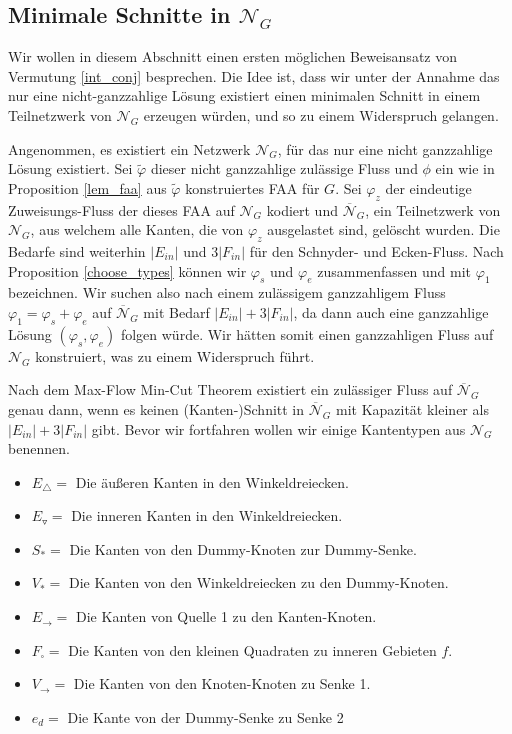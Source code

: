 \subsection{Minimale Schnitte in $\mathcal{N}_G$}

Wir wollen in diesem Abschnitt einen ersten möglichen Beweisansatz von Vermutung \ref{int_conj} besprechen. Die Idee ist, dass wir unter der Annahme das nur eine nicht-ganzzahlige Lösung existiert einen minimalen Schnitt in einem Teilnetzwerk von $\mathcal{N}_G$ erzeugen würden, und so zu einem Widerspruch gelangen. 

Angenommen, es existiert ein Netzwerk $\mathcal{N}_G$, für das nur eine nicht ganzzahlige Lösung existiert. Sei $\tilde{\varphi}$ dieser nicht ganzzahlige zulässige Fluss und $\phi$ ein wie in Proposition \ref{lem_faa} aus $\tilde{\varphi}$ konstruiertes FAA für $G$. Sei $\varphi_z$ der eindeutige Zuweisungs-Fluss der dieses FAA auf $\mathcal{N}_G$ kodiert und $\overline{\mathcal{N}}_G$, ein Teilnetzwerk von $\mathcal{N}_G$, aus welchem alle Kanten, die von $\varphi_z$ ausgelastet sind, gelöscht wurden. Die Bedarfe sind weiterhin $|E_{in}|$ und $3|F_{in}|$ für den Schnyder- und Ecken-Fluss. Nach Proposition \ref{choose_types} können wir $\varphi_s$ und $\varphi_e$ zusammenfassen und mit $\varphi_1$ bezeichnen. Wir suchen also nach einem zulässigem ganzzahligem Fluss $\varphi_1 = \varphi_s + \varphi_e$ auf $\overline{\mathcal{N}}_G$ mit Bedarf $|E_{in}| + 3|F_{in}|$, da dann auch eine ganzzahlige Lösung $(\varphi_s,\varphi_e)$ folgen würde. Wir hätten somit einen ganzzahligen Fluss auf $\mathcal{N}_G$ konstruiert, was zu einem Widerspruch führt.

Nach dem Max-Flow Min-Cut Theorem existiert ein zulässiger Fluss auf $\overline{\mathcal{N}}_G$ genau dann, wenn es keinen (Kanten-)Schnitt in $\overline{\mathcal{N}}_G$ mit Kapazität kleiner als $|E_{in}| + 3|F_{in}|$ gibt. Bevor wir fortfahren wollen wir einige Kantentypen aus $\mathcal{N}_G$ benennen.

\begin{itemize}
\item $E_\triangle = $ Die äußeren Kanten in den Winkeldreiecken.
\item $E_\triangledown = $ Die inneren Kanten in den Winkeldreiecken.
\item $S_* =$ Die Kanten von den Dummy-Knoten zur Dummy-Senke.
\item $V_* = $ Die Kanten von den Winkeldreiecken zu den Dummy-Knoten.
\item $E_{\to} = $ Die Kanten von Quelle 1 zu den Kanten-Knoten.
\item $F_\square = $ Die Kanten von den kleinen Quadraten zu inneren Gebieten $f$.
\item $V_{\to} = $ Die Kanten von den Knoten-Knoten zu Senke 1.
\item $e_{d} = $ Die Kante von der Dummy-Senke zu Senke 2
\end{itemize}

